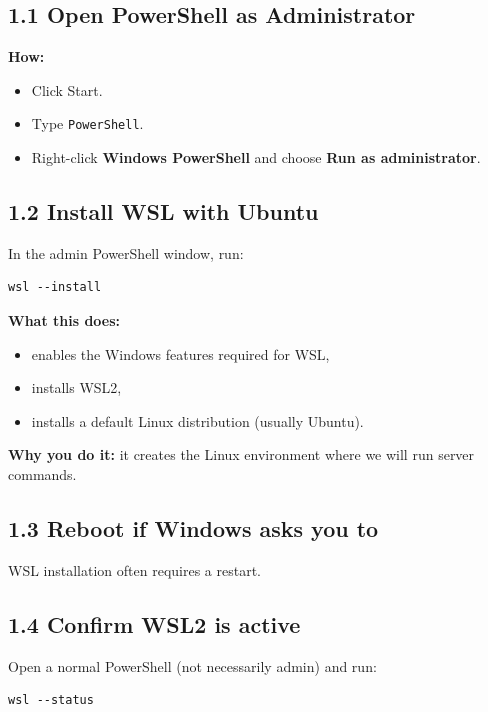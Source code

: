 \subsection{1.1 Open PowerShell as Administrator}
\textbf{How:}
\begin{itemize}[leftmargin=*]
  \item Click Start.
  \item Type \texttt{PowerShell}.
  \item Right-click \textbf{Windows PowerShell} and choose \textbf{Run as administrator}.
\end{itemize}


\subsection{1.2 Install WSL with Ubuntu}
In the admin PowerShell window, run:
\begin{lstlisting}
wsl --install
\end{lstlisting}

\textbf{What this does:}
\begin{itemize}[leftmargin=*]
  \item enables the Windows features required for WSL,
  \item installs WSL2,
  \item installs a default Linux distribution (usually Ubuntu).
\end{itemize}

\textbf{Why you do it:} it creates the Linux environment where we will run server commands.

\subsection{1.3 Reboot if Windows asks you to}
WSL installation often requires a restart.

\subsection{1.4 Confirm WSL2 is active}
Open a normal PowerShell (not necessarily admin) and run:
\begin{lstlisting}
wsl --status
\end{lstlisting}

